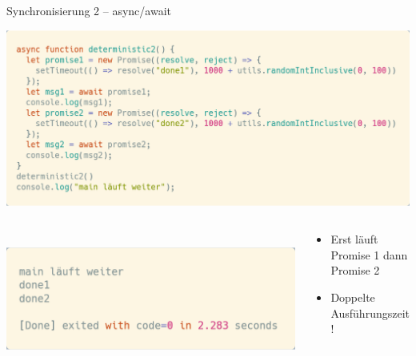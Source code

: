 \documentclass[t,handout]{beamer}
\begin{document}
\begin{frame}{Synchronisierung 2 -- async/await}
  \begin{center}
    \includegraphics[scale=.24]{fig/promises8.png}\\[-.2cm]
    \begin{columns}
      \begin{column}{0.48\textwidth}\\
        \includegraphics[scale=.21]{fig/promises9.png}
      \end{column}
      \begin{column}{0.48\textwidth}
        \begin{itemize}
          \item Erst läuft Promise 1 dann Promise 2
          \item Doppelte Ausführungszeit!
        \end{itemize}
      \end{column}
    \end{columns}
  \end{center}
\end{frame}
\end{document}
